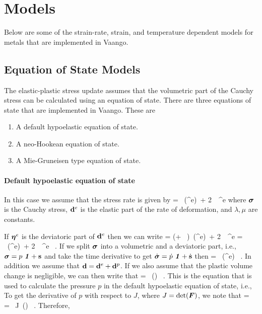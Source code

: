 \section{Models}
  Below are some of the strain-rate, strain, and temperature dependent models 
  for metals that are implemented in Vaango.

\subsection{Equation of State Models}
The elastic-plastic stress update assumes that the volumetric part of the 
Cauchy stress can be calculated using an equation of state.  There are 
three equations of state that are implemented in Vaango.  These are
\begin{enumerate}
    \item A default hypoelastic equation of state.
    \item A neo-Hookean equation of state.    
    \item A Mie-Gruneisen type equation of state.
\end{enumerate}

\paragraph{Default hypoelastic equation of state}
In this case we assume that the stress rate is given by
\Beq
    \dot{\Bsig} = \lambda~\Tr(\Bd^e)~\Bone + 2~\mu~\Bd^e
\Eeq
where $\boldsymbol{\sigma}$ is the Cauchy stress, $\mathbf{d}^e$ is the elastic part of
the rate of deformation, and $\lambda, \mu$ are constants.

If $\boldsymbol{\eta}^e$ is the deviatoric part of $\mathbf{d}^e$ then we can write
\Beq
    \dot{\Bsig} = \left(\lambda + ~\mu\right)~\Tr(\Bd^e)~\Bone + 
        2~\mu~\Beta^e = \kappa~\Tr(\Bd^e)~\Bone + 2~\mu~\Beta^e ~.
\Eeq
If we split $\boldsymbol{\sigma}$ into a volumetric and a deviatoric part, i.e.,
$\boldsymbol{\sigma} = p~\boldsymbol{\mathit{1}} + \mathbf{s}$ and take the time derivative to get
$\dot{\boldsymbol{\sigma}} = \dot{p}~\boldsymbol{\mathit{1}} + \dot{\mathbf{s}}$ then
\Beq
     = \kappa~\Tr(\Bd^e) ~.
\Eeq
In addition we assume that $\mathbf{d} = \mathbf{d}^e + \mathbf{d}^p$.  If we also assume that 
the plastic volume change is negligible, we can then write that
\Beq
     = \kappa~\Tr(\Bd) ~.
\Eeq
This is the equation that is used to calculate the pressure $p$ in the 
default hypoelastic equation of state, i.e.,
\Beq
\Eeq
To get the derivative of $p$ with respect to $J$, where $J = \det(\boldsymbol{F})$,
we note that
\Beq
     = ~ = ~J~\Tr(\Bd) ~.
\Eeq
Therefore,
\Beq
\Eeq

